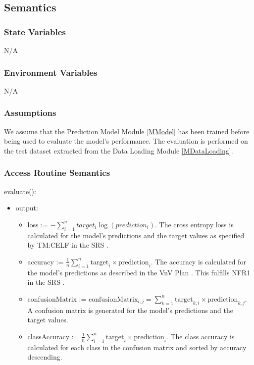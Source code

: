 \documentclass[12pt, titlepage]{article}
\begin{document}
\subsection{Semantics}

\subsubsection{State Variables}

N/A

\subsubsection{Environment Variables}

N/A

\subsubsection{Assumptions}

We assume that the Prediction Model Module \ref{MModel} has been trained
before being used to evaluate the model's performance. The evaluation is
performed on the test dataset extracted from the Data Loading Module
\ref{MDataLoading}.

\subsubsection{Access Routine Semantics}

\noindent evaluate():
\begin{itemize}
\item output:
  \begin{itemize}
    \item loss := $- \sum_{i=1}^{n} target_i \log(prediction_i)$. The cross
    entropy loss is calculated for the model's predictions and the target values
    as specified by TM:CELF in the SRS \cite[4.2.2]{SRS}.
    \item accuracy := $\frac{1}{n} \sum_{i=1}^{n} \text{target}_i \times
    \text{prediction}_i$. The accuracy is calculated for the model's predictions
    as described in the VnV Plan \citep{VnV}. This fulfills NFR1 in the SRS \citep{SRS}.
    \item confusionMatrix := $\text{confusionMatrix}_{i,j} = \sum_{k=1}^{n} \text{target}_{k,i} \times \text{prediction}_{k,j}$. A confusion matrix is generated for the model's predictions and the target values.
    \item classAccuracy := $\frac{1}{n} \sum_{i=1}^{n} \text{target}_i \times
    \text{prediction}_i$. The class accuracy is calculated for each class in the
    confusion matrix and sorted by accuracy descending.
  \end{itemize}
\end{itemize}
\end{document}
